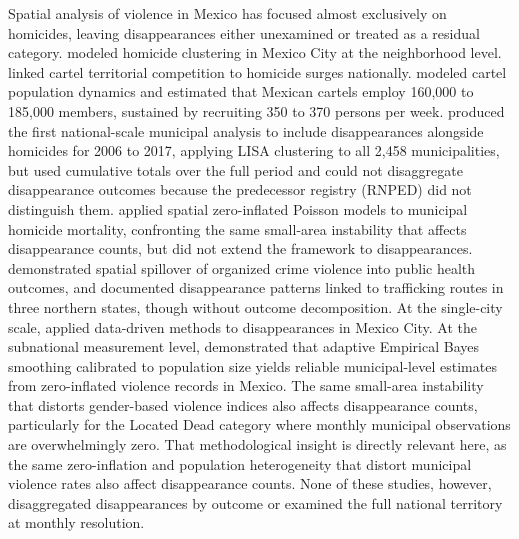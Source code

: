 Spatial analysis of violence in Mexico has focused almost exclusively on homicides, leaving disappearances either unexamined or treated as a residual category.
\citet{vilalta_muggah_2016, vilalta_2021} modeled homicide clustering in Mexico City at the neighborhood level.
\citet{rios_2013} linked cartel territorial competition to homicide surges nationally.
\citet{prieto_curiel_2023} modeled cartel population dynamics and 
estimated that Mexican cartels employ 160,000 to 185,000 members, 
sustained by recruiting 350 to 370 persons per week. \citet{cadena_garrocho_2019} produced the first national-scale municipal 
analysis to include disappearances alongside homicides for 2006 to 2017, 
applying LISA clustering to all 2,458 municipalities, but used cumulative 
totals over the full period and could not disaggregate disappearance 
outcomes because the predecessor registry (RNPED) did not distinguish 
them.
\citet{baptista_davila_2026} applied spatial zero-inflated Poisson models to municipal homicide mortality, confronting the same small-area instability that affects disappearance counts, but did not extend the framework to disappearances.
\citet{das_2025} demonstrated spatial spillover of organized crime violence into public health outcomes, and \citet{atuesta_2024} documented disappearance patterns linked to trafficking routes in three northern states, though without outcome decomposition.
At the single-city scale, \citet{aguilar_velazquez_2025} applied data-driven methods to disappearances in Mexico City.
At the subnational measurement level, \citet{escobar_vawri_2026} 
demonstrated that adaptive Empirical Bayes smoothing calibrated to 
population size yields reliable municipal-level estimates from 
zero-inflated violence records in Mexico.
The same small-area instability that distorts gender-based violence 
indices also affects disappearance counts, particularly for the 
Located Dead category where monthly municipal observations are 
overwhelmingly zero. That methodological insight is directly relevant here, as the same zero-inflation and population heterogeneity that distort municipal violence rates also affect disappearance counts.
None of these studies, however, disaggregated disappearances by outcome or examined the full national territory at monthly resolution.


